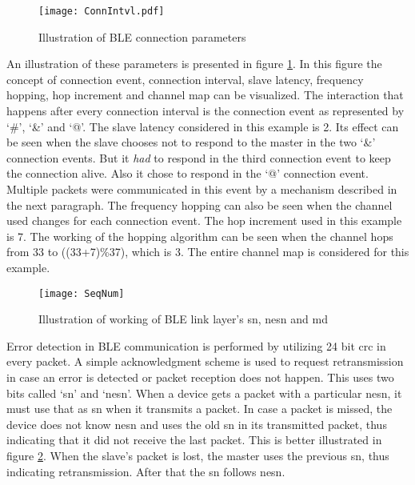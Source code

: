 \begin{figure}[h]
\centering
\texttt{[image: ConnIntvl.pdf]}
\caption{Illustration of BLE connection parameters}
\label{fig:ConnIntvl}
\end{figure}

An illustration of these parameters is presented in figure \ref{fig:ConnIntvl}. In this figure the concept of connection event, connection interval, slave latency, frequency hopping, hop increment and channel map can be visualized. The interaction that happens after every connection interval is the connection event as represented by `\#', `\&' and `@'. The slave latency considered in this example is 2. Its effect can be seen when the slave chooses not to respond to the master in the two `\&' connection events. But it \emph{had} to respond in the third connection event to keep the connection alive. Also it chose to respond in the `@' connection event. Multiple packets were communicated in this event by a mechanism described in the next paragraph. The frequency hopping can also be seen when the channel used changes for each connection event. The hop increment used in this example is 7. The working of the hopping algorithm can be seen when the channel hops from 33 to ((33+7)\%37), which is 3. The entire channel map is considered for this example. 


\begin{figure}[h]
\texttt{[image: SeqNum]}
\caption{Illustration of working of BLE link layer's \gls{sn}, \gls{nesn} and \acrshort{md}}
\label{fig:SeqNum}
\end{figure}

Error detection in BLE communication is performed by utilizing 24 bit \gls{crc} in every packet. A simple acknowledgment scheme is used to request retransmission in case an error is detected or packet reception does not happen. This uses two bits called `\gls{sn}' and `\gls{nesn}'. When a device gets a packet with a particular \gls{nesn},  it must use that as \gls{sn} when it transmits a packet. In case a packet is missed, the device does not know \gls{nesn} and uses the old \gls{sn} in its transmitted packet, thus indicating that it did not receive the last packet. This is better illustrated in figure \ref{fig:SeqNum}. When the slave's packet is lost, the master uses the previous \gls{sn}, thus indicating retransmission. After that the \gls{sn} follows \gls{nesn}.

